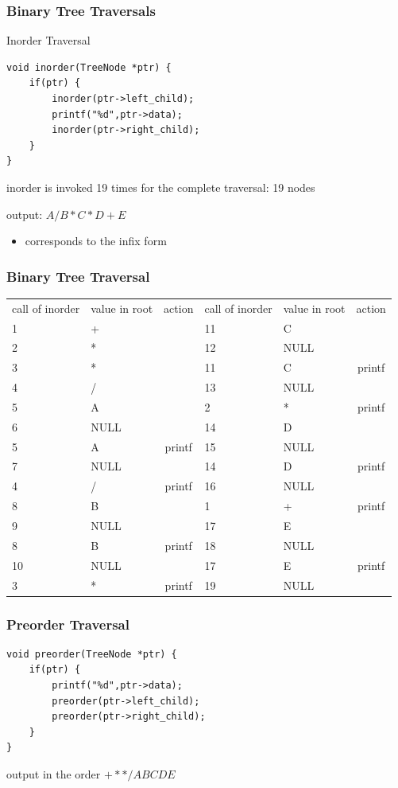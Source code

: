 \documentclass[newPxFont,sthlmFooter,nooffset]{beamer}
\begin{document}
\begin{frame}[t, fragile]
  \frametitle{Binary Tree Traversals}
Inorder Traversal

\begin{lstlisting}
void inorder(TreeNode *ptr) { 
    if(ptr) {
        inorder(ptr->left_child); 
        printf("%d",ptr->data); 
        inorder(ptr->right_child);
    } 
}  
\end{lstlisting}
inorder is invoked 19 times for the complete traversal: 19 nodes

output: $A/B*C*D+E$
\begin{itemize}
\item  corresponds to the infix form
\end{itemize}

\end{frame}

\begin{frame}[t]
  \frametitle{Binary Tree Traversal}
  \begin{tabular}{p{4em} p{4em} c || p{4em} p{4em} c}
call of inorder & value in root & action & call of inorder & value in root & action \\
1	&	+	&		&	11	&	C	&		\\
2	&	*	&		&	12	&	NULL	&		\\
3	&	*	&		&	11	&	C	&	printf	\\
4	&	/	&		&	13	&	NULL	&		\\
5	&	A	&		&	2	&	*	&	printf	\\
6	&	NULL	&		&	14	&	D	&		\\
5	&	A	&	printf	&	15	&	NULL	&		\\
7	&	NULL	&		&	14	&	D	&	printf	\\
4	&	/	&	printf	&	16	&	NULL	&		\\
8	&	B	&		&	1	&	+	&	printf	\\
9	&	NULL	&		&	17	&	E	&		\\
8	&	B	&	printf	&	18	&	NULL	&		\\
10	&	NULL	&		&	17	&	E	&	printf	\\
3	&	*	&	printf	&	19	&	NULL	&		\\    
  \end{tabular}
\end{frame}


\begin{frame}[t, fragile]
  \frametitle{Preorder Traversal}

\begin{lstlisting}
void preorder(TreeNode *ptr) { 
    if(ptr) {
        printf("%d",ptr->data); 
        preorder(ptr->left_child); 
        preorder(ptr->right_child);
    } 
}  
\end{lstlisting}

output in the order $+**/ABCDE$

\end{frame}
\end{document}
